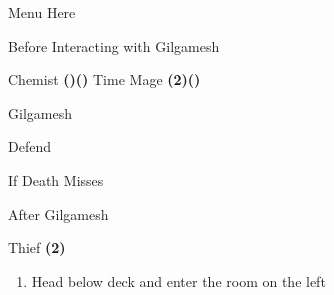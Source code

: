 \begin{paracol}{2}
\switchcolumn
\begin{misc}{Menu Here}
\end{misc}

\switchcolumn
\begin{menu}{Before Interacting with Gilgamesh}
    \varwb
    \begin{itemMenu}
        \hiPotionMenu {}
    \end{itemMenu}
    \begin{jobMenu}
        \bartz Chemist \textbf{(\pointUp)(\pointRight)} \ability{!\gilToss} \optimize
        \galuf Time Mage \textbf{(2\pointLeft)(\pointUp)}
    \end{jobMenu}
    \varwe
\end{menu}

\begin{boss}{Gilgamesh}
	\varwb
	\begin{round}{1}
		\faris \hiPotion \space \then {}
        \bartz Defend
        \lenna \leftCommand{\release}
        \item {}
        \item {}
        \item {}
        \item {}
        \vspace{1mm}
        \item[] 
	\end{round}
    \begin{bossPart}{If Death Misses}
        \galuf \leftCommand{\dimenAbility} \then \reset
    \end{bossPart}
	\varwe
\end{boss}

\begin{menu}{After Gilgamesh}
    \varwb
    \begin{jobMenu}
        \galuf Thief \textbf{(2\pointRight)} \ability{!\escape}
    \end{jobMenu}
    \varwe
\end{menu}

\begin{enumerate}[resume]
    \item Head below deck and enter the room on the left
\end{enumerate}

\end{paracol}